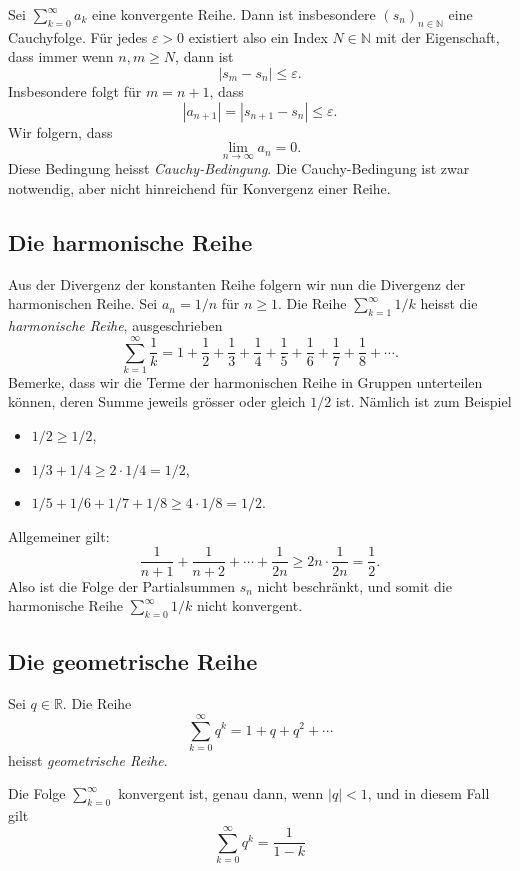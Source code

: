 \documentclass[../main.tex]{subfiles}
\begin{document}
\begin{remark}
  Sei $\sum_{k=0}^{\infty} a_k$ eine konvergente Reihe.
  Dann ist insbesondere ${(s_{n})}_{n \in \mathbb{N}}$ 
  eine Cauchyfolge.
  Für jedes $\varepsilon > 0$ existiert also ein Index
  $N \in \mathbb{N}$ mit der Eigenschaft, dass
  immer wenn $n, m \geq N$, dann ist
  \[
    |s_m - s_n| \leq \varepsilon.
  \]
  Insbesondere folgt für $m = n + 1$, dass
  \[
    |a_{n+1}| = |s_{n+1} - s_n| \leq \varepsilon.
  \]
  Wir folgern, dass
  \[
    \lim_{n \to \infty}a_n = 0.
  \]
  Diese Bedingung heisst  \emph{Cauchy-Bedingung}.
  Die Cauchy-Bedingung ist zwar notwendig, aber nicht
  hinreichend für Konvergenz einer Reihe.
\end{remark}

\subsection*{Die harmonische Reihe}
Aus der Divergenz der konstanten Reihe folgern wir
nun die Divergenz der harmonischen Reihe.
Sei $a_n = 1/n$ für $n \geq 1$. Die Reihe
$\sum_{k=1}^{\infty} 1/k$ heisst die
\emph{harmonische Reihe}, ausgeschrieben
\[
  \sum_{k=1}^{\infty} \frac{1}{k} = 
  1 + \frac{1}{2} + \frac{1}{3}
  + \frac{1}{4}
  + \frac{1}{5}
  + \frac{1}{6}
  + \frac{1}{7}
  + \frac{1}{8}
  + \cdots.
\]
Bemerke, dass wir die Terme der harmonischen Reihe
in Gruppen unterteilen können, deren Summe
jeweils grösser oder gleich $1/2$ ist. Nämlich ist
zum Beispiel
\begin{itemize}
  \item $1/2 \geq 1/2$,
  \item $1/3 + 1/4 \geq 2\cdot 1/4 = 1/2$,
  \item $1/5 + 1/6 + 1/7 + 1/8 \geq 4 \cdot 1/8 = 1/2$.
\end{itemize}
Allgemeiner gilt:
\[
  \frac{1}{n+1} + \frac{1}{n+2} + \cdots + \frac{1}{2n}
  \geq 2n \cdot \frac{1}{2n} = \frac{1}{2}.
\]
Also ist die Folge der Partialsummen $s_n$ nicht
beschränkt, und somit die 
harmonische Reihe 
$\sum_{k=0}^{\infty} 1/k$ nicht konvergent.

\subsection*{Die geometrische Reihe}
Sei $q \in \mathbb{R}$. Die Reihe
\[
  \sum_{k=0}^{\infty} q^k = 1 + q + q^2 + \cdots
\]
heisst \emph{geometrische Reihe}.


\begin{claim}
  Die Folge
  $\sum_{k=0}^{\infty}$ konvergent ist, genau dann,
  wenn $|q| < 1$, und in diesem Fall gilt
  \[
    \sum_{k=0}^{\infty} q^k = \frac{1}{1-k}
  \]
\end{claim}
\end{document}
